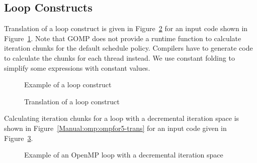 \subsection{Loop Constructs}
Translation of a loop construct is given in
Figure~\ref{Manual:omp:ompfor-trans} for an input code shown in
Figure~\ref{Manual:omp:ompfor}. 
Note that GOMP does not provide a runtime function to calculate iteration chunks for the default schedule policy. 
Compilers have to generate code to calculate the chunks for each thread instead. 
We use constant folding to simplify some expressions with constant values. 

\lstset{language=C,basicstyle=\scriptsize}
\begin{figure}[htbp]
{\indent
  {\mySmallFontSize
    \begin{latexonly}
    
    \end{latexonly}
    \begin{htmlonly}
    
    \end{htmlonly}
  }
}
\caption{Example of a loop construct}
\label{Manual:omp:ompfor}
\end{figure}

\begin{figure}[htbp]
{\indent
  {\mySmallFontSize
    \begin{latexonly}
    
    \end{latexonly}
    \begin{htmlonly}
    
    \end{htmlonly}
  }
}
\caption{Translation of a loop construct}
\label{Manual:omp:ompfor-trans}
\end{figure}

Calculating iteration chunks for a loop with a decremental iteration space is shown in 
Figure~\ref{Manual:omp:ompfor5-trans} for an input code given in
Figure~\ref{Manual:omp:ompfor5}. 

\lstset{language=C,basicstyle=\scriptsize}
\begin{figure}[htbp]
{\indent
  {\mySmallFontSize
    \begin{latexonly}
    
    \end{latexonly}
    \begin{htmlonly}
    
    \end{htmlonly}
  }
}
\caption{Example of an OpenMP loop with a decremental iteration space}
\label{Manual:omp:ompfor5}
\end{figure}

